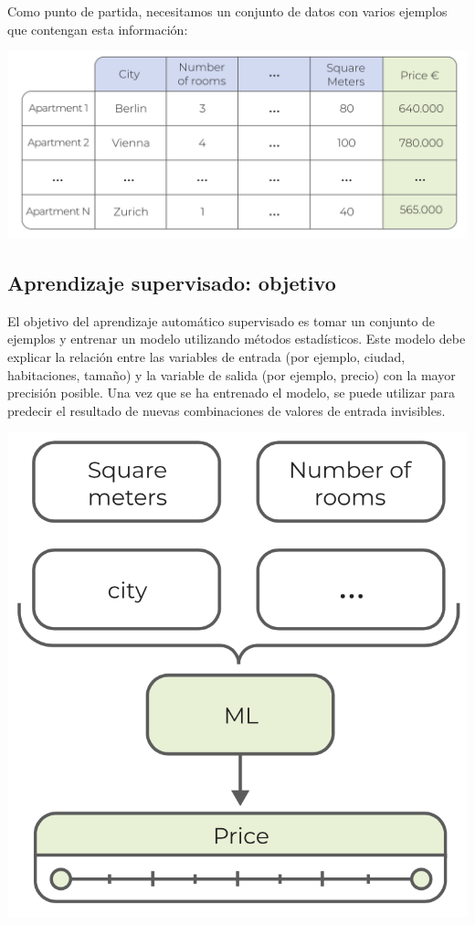 \documentclass[
]{book}
\begin{document}
Como punto de partida, necesitamos un conjunto de datos con varios ejemplos que contengan esta información:

\includegraphics{img/tab1.png}

\hypertarget{aprendizaje-supervisado-objetivo}{%
\subsection{Aprendizaje supervisado: objetivo}\label{aprendizaje-supervisado-objetivo}}

El objetivo del aprendizaje automático supervisado es tomar un conjunto de ejemplos y entrenar un modelo utilizando métodos estadísticos. Este modelo debe explicar la relación entre las variables de entrada (por ejemplo, ciudad, habitaciones, tamaño) y la variable de salida (por ejemplo, precio) con la mayor precisión posible. Una vez que se ha entrenado el modelo, se puede utilizar para predecir el resultado de nuevas combinaciones de valores de entrada invisibles.

\includegraphics{img/sup.png}
\end{document}
